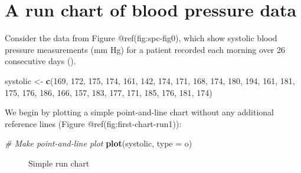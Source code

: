 \documentclass[
]{book}
\makeatletter
\newenvironment{Shaded}{\begin{snugshade}}{\end{snugshade}}
\newcommand{\AttributeTok}[1]{\textcolor[rgb]{0.13,0.29,0.53}{#1}}
\newcommand{\CommentTok}[1]{\textcolor[rgb]{0.56,0.35,0.01}{\textit{#1}}}
\newcommand{\DecValTok}[1]{\textcolor[rgb]{0.00,0.00,0.81}{#1}}
\newcommand{\FunctionTok}[1]{\textcolor[rgb]{0.13,0.29,0.53}{\textbf{#1}}}
\newcommand{\NormalTok}[1]{#1}
\newcommand{\OtherTok}[1]{\textcolor[rgb]{0.56,0.35,0.01}{#1}}
\newcommand{\StringTok}[1]{\textcolor[rgb]{0.31,0.60,0.02}{#1}}
\newcommand*\pandocbounded[1]{%
  \sbox\pandoc@box{#1}%
  \Gscale@div\@tempa{\textheight}{\dimexpr\ht\pandoc@box+\dp\pandoc@box\relax}%
  \Gscale@div\@tempb{\linewidth}{\wd\pandoc@box}%
  \ifdim\@tempb\p@<\@tempa\p@\let\@tempa\@tempb\fi%
  \ifdim\@tempa\p@<\p@\scalebox{\@tempa}{\usebox\pandoc@box}%
  \else\usebox{\pandoc@box}%
  \fi%
}
\makeatother
\begin{document}
\section{A run chart of blood pressure
data}\label{a-run-chart-of-blood-pressure-data}

Consider the data from Figure @ref(fig:spc-fig0), which show systolic
blood pressure measurements (mm Hg) for a patient recorded each morning
over 26 consecutive days ().

\begin{Shaded}
\begin{Highlighting}[]
\NormalTok{systolic }\OtherTok{\textless{}{-}} \FunctionTok{c}\NormalTok{(}\DecValTok{169}\NormalTok{, }\DecValTok{172}\NormalTok{, }\DecValTok{175}\NormalTok{, }\DecValTok{174}\NormalTok{, }\DecValTok{161}\NormalTok{, }\DecValTok{142}\NormalTok{,}
              \DecValTok{174}\NormalTok{, }\DecValTok{171}\NormalTok{, }\DecValTok{168}\NormalTok{, }\DecValTok{174}\NormalTok{, }\DecValTok{180}\NormalTok{, }\DecValTok{194}\NormalTok{,}
              \DecValTok{161}\NormalTok{, }\DecValTok{181}\NormalTok{, }\DecValTok{175}\NormalTok{, }\DecValTok{176}\NormalTok{, }\DecValTok{186}\NormalTok{, }\DecValTok{166}\NormalTok{,}
              \DecValTok{157}\NormalTok{, }\DecValTok{183}\NormalTok{, }\DecValTok{177}\NormalTok{, }\DecValTok{171}\NormalTok{, }\DecValTok{185}\NormalTok{, }\DecValTok{176}\NormalTok{,}
              \DecValTok{181}\NormalTok{, }\DecValTok{174}\NormalTok{)}
\end{Highlighting}
\end{Shaded}

We begin by plotting a simple point-and-line chart without any
additional reference lines (Figure @ref(fig:first-chart-run1)):

\begin{Shaded}
\begin{Highlighting}[]
\CommentTok{\# Make point{-}and{-}line plot}
\FunctionTok{plot}\NormalTok{(systolic, }\AttributeTok{type =} \StringTok{\textquotesingle{}o\textquotesingle{}}\NormalTok{)}
\end{Highlighting}
\end{Shaded}

\begin{figure}
\centering
\pandocbounded{}
\caption{Simple run chart}
\end{figure}
\end{document}
